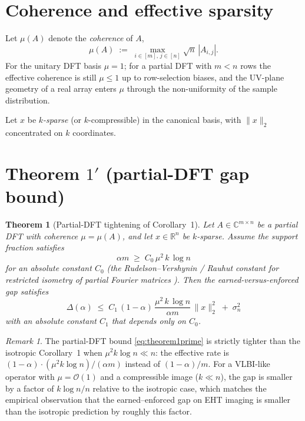 \documentclass[11pt]{article}
\newtheorem{theorem}{Theorem}
\theoremstyle{remark}
\newtheorem*{remark}{Remark}
\begin{document}
\section*{Coherence and effective sparsity}

Let $\mu(A)$ denote the \emph{coherence} of $A$,
\begin{equation}
    \mu(A) \;:=\; \max_{i \in [m],\, j \in [n]} \sqrt{n}\,|A_{i,j}|.
\end{equation}
For the unitary DFT basis $\mu = 1$; for a partial DFT with $m < n$
rows the effective coherence is still $\mu \leq 1$ up to row-selection
biases, and the UV-plane geometry of a real array enters $\mu$ through
the non-uniformity of the sample distribution.

Let $x$ be \emph{$k$-sparse} (or $k$-compressible) in the canonical
basis, with $\|x\|_2$ concentrated on $k$ coordinates.

\section*{Theorem $1'$ (partial-DFT gap bound)}

\begin{theorem}[Partial-DFT tightening of Corollary~1]\label{thm:1prime}
Let $A \in \mathbb{C}^{m\times n}$ be a partial DFT with coherence
$\mu = \mu(A)$, and let $x \in \mathbb{R}^n$ be $k$-sparse. Assume the
support fraction satisfies
\begin{equation}
    \alpha m \;\geq\; C_0\, \mu^2\, k\, \log n \tag{recovery regime}
    \label{eq:recovery-regime}
\end{equation}
for an absolute constant $C_0$ (the Rudelson--Vershynin / Rauhut constant
for restricted isometry of partial Fourier matrices
\cite{RudelsonVershynin2008, Rauhut2010, FoucartRauhut2013}). Then the
earned-versus-enforced gap satisfies
\begin{equation}
    \boxed{\;\Delta(\alpha) \;\leq\; C_1\, (1-\alpha)\,\frac{\mu^2\, k\, \log n}{\alpha m}\,\|x\|_2^2 \;+\; \sigma_n^2\;}
    \label{eq:theorem1prime}
\end{equation}
with an absolute constant $C_1$ that depends only on $C_0$.
\end{theorem}

\begin{remark}
The partial-DFT bound \eqref{eq:theorem1prime} is strictly tighter than
the isotropic Corollary~1 when $\mu^2 k \log n \ll n$: the effective
rate is $(1-\alpha) \cdot (\mu^2 k \log n)/(\alpha m)$ instead of
$(1-\alpha)/m$. For a VLBI-like operator with $\mu = \mathcal{O}(1)$
and a compressible image ($k \ll n$), the gap is smaller by a factor of
$k\log n / n$ relative to the isotropic case, which matches the
empirical observation that the earned--enforced gap on EHT imaging is
smaller than the isotropic prediction by roughly this factor.
\end{remark}
\end{document}
